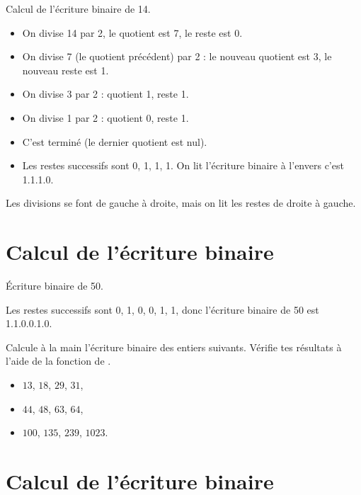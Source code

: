 \documentclass[11pt,class=report,crop=false]{standalone}
\begin{document}
\begin{exemple}
Calcul de l'écriture binaire de 14.

\begin{itemize}
  \item On divise 14 par 2, le quotient est 7, le reste est 0.
  \item On divise 7 (le quotient précédent) par 2 : le nouveau quotient est 3, le nouveau reste est 1.
  \item On divise 3 par 2 : quotient 1, reste 1.
  \item On divise 1 par 2 : quotient 0, reste 1.
  \item C'est terminé (le dernier quotient est nul).
  \item Les restes successifs sont 0, 1, 1, 1. On lit l'écriture binaire à l'envers c'est 1.1.1.0.  
\end{itemize}

Les divisions se font de gauche à droite, mais on lit les restes de droite à gauche.

\end{exemple}


\newpage
  \section*{Calcul de l'écriture binaire}
  
\begin{exemple}
Écriture binaire de 50.


Les restes successifs sont 0, 1, 0, 0, 1, 1, donc l'écriture binaire de 50 est 1.1.0.0.1.0.
\end{exemple}

Calcule à la main l'écriture binaire des entiers suivants. Vérifie tes résultats à l'aide de la fonction  de \Python.
  
   \begin{itemize}
    \item $13$, $18$, $29$, $31$,
    \item $44$, $48$, $63$, $64$,
    \item $100$, $135$, $239$, $1023$.
  \end{itemize} 


\newpage
  \section*{Calcul de l'écriture binaire}
  
\end{document}
